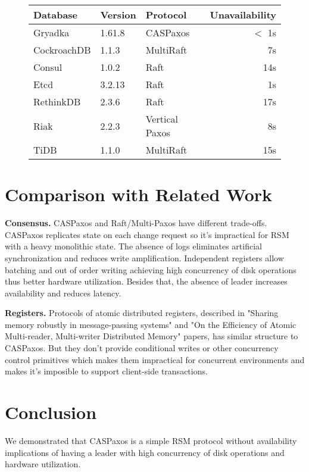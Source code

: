 \documentclass[a4paper,USenglish]{lipics-v2018}
\theoremstyle{definition}
\begin{document}
\begin{figure}[!h]
    \centering
    \begin{tabular}{|l|l|l|r|}
        \hline
        Database & Version & Protocol & Unavailability\\
        \hline
        \hline
        Gryadka & 1.61.8 & CASPaxos & $<$ 1s\\
        \hline
        CockroachDB & 1.1.3 & MultiRaft & 7s\\
        Consul & 1.0.2 & Raft & 14s\\
        Etcd & 3.2.13 & Raft & 1s\\
        RethinkDB & 2.3.6 & Raft & 17s\\
        Riak & 2.2.3 & Vertical Paxos & 8s\\
        TiDB & 1.1.0 & MultiRaft & 15s\\
        \hline
    \end{tabular}
\end{figure}

\section{Comparison with Related Work}

{\bf Consensus.} CASPaxos and Raft/Multi-Paxos have different trade-offs. CASPaxos replicates state on each change request so it's impractical for RSM with a heavy monolithic state. The absence of logs eliminates artificial synchronization and reduces write amplification. Independent registers allow batching and out of order writing achieving high concurrency of disk operations thus better hardware utilization. Besides that, the absence of leader increases availability and reduces latency.

{\bf Registers.} Protocols of atomic distributed registers, described in "Sharing memory robustly in message-passing systems"\cite{abd} and "On the Efficiency of Atomic Multi-reader, Multi-writer Distributed Memory"\cite{mwmr} papers, has similar structure to CASPaxos. But they don't provide conditional writes or other concurrency control primitives which makes them impractical for concurrent environments and makes it's imposible to support client-side transactions.

\section{Conclusion}

We demonstrated that CASPaxos is a simple RSM protocol without availability implications of having a leader with high concurrency of disk operations and hardware utilization.
\end{document}
